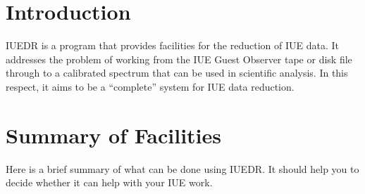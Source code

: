 \begin{latexonly}
   \setlength{\parskip}{0mm}
   \latexonlytoc
   \setlength{\parskip}{\medskipamount}
   \markright{\stardocname}
 \end{latexonly}

\newpage
\renewcommand{\thepage}{\arabic{page}}
\setcounter{page}{1}
\section {\label{se:introduction}Introduction}

IUEDR is a program that provides facilities for the reduction of IUE data.
It addresses the problem of working from the IUE Guest Observer tape or disk
file through to a calibrated spectrum that can be used in scientific analysis.
In this respect, it aims to be a ``complete'' system for IUE data reduction.

\section {\label{se:facilities}Summary of Facilities}

Here is a brief summary of what can be done using IUEDR\@.
It should help you to decide whether it can help with your IUE work.

